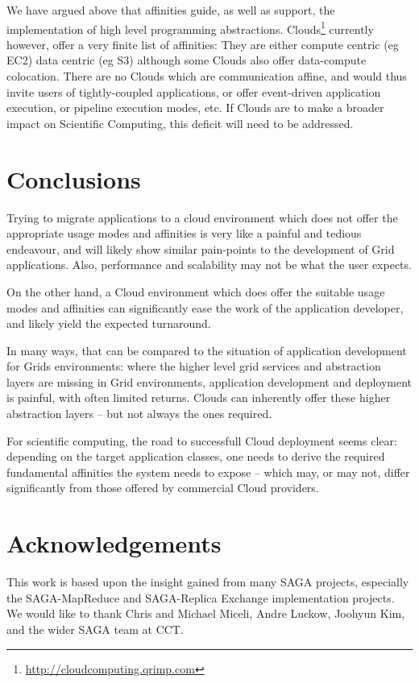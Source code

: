 \documentclass{article}
\begin{document}
We have argued above that affinities guide, as well as support, the
implementation of high level programming abstractions.
Clouds\footnote{\url{http://cloudcomputing.qrimp.com}} currently
however, offer a very finite list of affinities: They are either
compute centric (eg EC2)
data centric (eg S3)
although some Clouds also offer data-compute colocation.  
There are no Clouds which are communication affine, and would thus
invite users of tightly-coupled applications, or offer event-driven
application execution, or pipeline execution modes, etc.  If Clouds
are to make a broader impact on Scientific Computing, this deficit
will need to be addressed. 

\section{Conclusions}
\label{sec:conclusion}

  Trying to migrate applications to a cloud environment which
  does not offer the appropriate usage modes and affinities is
  very like a painful and tedious endeavour, and will likely
  show similar pain-points to the development of Grid
  applications.  Also, performance and scalability may not be
  what the user expects.

  On the other hand, a Cloud environment which does offer the
  suitable usage modes and affinities can significantly ease
  the work of the application developer, and likely yield the
  expected turnaround.

  In many ways, that can be compared to the situation of application
  development for Grids environments: where the higher level grid
  services and abstraction layers are missing in Grid environments,
  application development and deployment is painful, with often
  limited returns.  Clouds can inherently offer these higher
  abstraction layers -- but not always the ones required.

  For scientific computing, the road to successfull Cloud deployment
  seems clear: depending on the target application classes, one needs
  to derive the required fundamental affinities the system needs to
  expose -- which may, or may not, differ significantly from those
  offered by commercial Cloud providers.

\section{Acknowledgements}
\label{sec:acks}

This work is based upon the insight gained from many SAGA projects,
especially the SAGA-MapReduce and SAGA-Replica Exchange implementation
projects. We would like to thank Chris and Michael Miceli, Andre
Luckow, Joohyun Kim, and the wider SAGA team at CCT.



\end{document}
